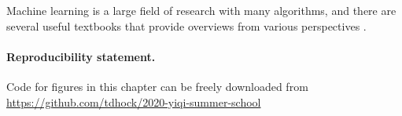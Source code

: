 \documentclass[12pt]{article}
\begin{document}
Machine learning is a large field of research with many algorithms,
and there are several useful textbooks that provide overviews from
various perspectives \citep{Bishop2006, Hastie2009, Wasserman2010,
  Murphy2013, Goodfellow2016}.

\paragraph{Reproducibility statement.} Code for figures in this
chapter can be freely downloaded from
\url{https://github.com/tdhock/2020-yiqi-summer-school}


 
\end{document}

